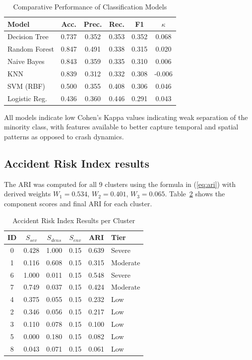 \documentclass[conference]{IEEEtran}
\begin{document}
\begin{table}[htbp]
\caption{Comparative Performance of Classification Models}
\begin{center}
\footnotesize
\begin{tabular}{lccccc}
\toprule
\textbf{Model} & \textbf{Acc.} & \textbf{Prec.} & \textbf{Rec.} & \textbf{F1} & \textbf{$\kappa$} \\
\midrule
Decision Tree & 0.737 & 0.352 & 0.353 & 0.352 & 0.068 \\
Random Forest & 0.847 & 0.491 & 0.338 & 0.315 & 0.020 \\
Naive Bayes & 0.843 & 0.359 & 0.335 & 0.310 & 0.006 \\
KNN & 0.839 & 0.312 & 0.332 & 0.308 & -0.006 \\
SVM (RBF) & 0.500 & 0.355 & 0.408 & 0.306 & 0.046 \\
Logistic Reg. & 0.436 & 0.360 & 0.446 & 0.291 & 0.043 \\
\bottomrule
\end{tabular}
\label{tab:model_comparison}
\end{center}
\end{table}

All models indicate low Cohen's Kappa values indicating weak separation of the minority class, with features available to better capture temporal and spatial patterns as opposed to crash dynamics.
\subsection{Accident Risk Index results}

The ARI was computed for all 9 clusters using the formula in (\ref{eq:ari}) with derived weights $W_1 = 0.534$, $W_2 = 0.401$, $W_3 = 0.065$. Table~\ref{tab:ari_results} shows the component scores and final ARI for each cluster.

\begin{table}[htbp]
\caption{Accident Risk Index Results per Cluster}
\begin{center}
\footnotesize
\begin{tabular}{cccccl}
\toprule
\textbf{ID} & $S_{sev}$ & $S_{dens}$ & $S_{env}$ & \textbf{ARI} & \textbf{Tier} \\
\midrule
0 & 0.428 & 1.000 & 0.15 & 0.639 & Severe \\
1 & 0.116 & 0.608 & 0.15 & 0.315 & Moderate \\
6 & 1.000 & 0.011 & 0.15 & 0.548 & Severe \\
7 & 0.749 & 0.037 & 0.15 & 0.424 & Moderate \\
4 & 0.375 & 0.055 & 0.15 & 0.232 & Low \\
2 & 0.346 & 0.056 & 0.15 & 0.217 & Low \\
3 & 0.110 & 0.078 & 0.15 & 0.100 & Low \\
5 & 0.000 & 0.180 & 0.15 & 0.082 & Low \\
8 & 0.043 & 0.071 & 0.15 & 0.061 & Low \\
\bottomrule
\end{tabular}
\label{tab:ari_results}
\end{center}
\end{table}
\end{document}
